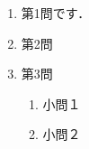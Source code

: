 \documentclass[landscape,b4paper,twocolumn]{jarticle}
\begin{document}
\medskip
\begin{enumerate}\itemindent.5zw
	\item 第1問です．
	\vfill
	\item 第2問
	\vfill
\newpage
	\item 第3問
	\begin{enumerate}
		\item 小問１
		\vfill
		\item 小問２
		\vfill\vfill
	\end{enumerate}
\end{enumerate}
\end{document}
